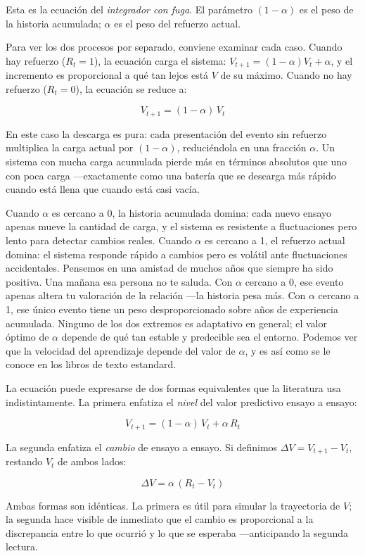 \documentclass[
  letterpaper,
  DIV=11,
  numbers=noendperiod]{scrreprt}
\begin{document}
\begin{tcolorbox}[enhanced jigsaw, toprule=.15mm, arc=.35mm, colback=white, opacityback=0, colframe=quarto-callout-note-color-frame, breakable, rightrule=.15mm, left=2mm, leftrule=.75mm, bottomrule=.15mm]
Esta es la ecuación del \emph{integrador con fuga}. El parámetro
\((1-\alpha)\) es el peso de la historia acumulada; \(\alpha\) es el
peso del refuerzo actual.

Para ver los dos procesos por separado, conviene examinar cada caso.
Cuando hay refuerzo (\(R_t = 1\)), la ecuación carga el sistema:
\(V_{t+1} = (1-\alpha)V_t + \alpha\), y el incremento es proporcional a
qué tan lejos está \(V\) de su máximo. Cuando no hay refuerzo
(\(R_t = 0\)), la ecuación se reduce a:

\[V_{t+1} = (1-\alpha)\,V_t\]

En este caso la descarga es pura: cada presentación del evento sin
refuerzo multiplica la carga actual por \((1-\alpha)\), reduciéndola en
una fracción \(\alpha\). Un sistema con mucha carga acumulada pierde más
en términos absolutos que uno con poca carga ---exactamente como una
batería que se descarga más rápido cuando está llena que cuando está
casi vacía.

Cuando \(\alpha\) es cercano a 0, la historia acumulada domina: cada
nuevo ensayo apenas mueve la cantidad de carga, y el sistema es
resistente a fluctuaciones pero lento para detectar cambios reales.
Cuando \(\alpha\) es cercano a 1, el refuerzo actual domina: el sistema
responde rápido a cambios pero es volátil ante fluctuaciones
accidentales. Pensemos en una amistad de muchos años que siempre ha sido
positiva. Una mañana esa persona no te saluda. Con \(\alpha\) cercano a
0, ese evento apenas altera tu valoración de la relación ---la historia
pesa más. Con \(\alpha\) cercano a 1, ese único evento tiene un peso
desproporcionado sobre años de experiencia acumulada. Ninguno de los dos
extremos es adaptativo en general; el valor óptimo de \(\alpha\) depende
de qué tan estable y predecible sea el entorno. Podemos ver que la
velocidad del aprendizaje depende del valor de \(\alpha\), y es así como
se le conoce en los libros de texto estandard.

La ecuación puede expresarse de dos formas equivalentes que la
literatura usa indistintamente. La primera enfatiza el \emph{nivel} del
valor predictivo ensayo a ensayo:

\[V_{t+1} = (1-\alpha)\,V_t + \alpha\,R_t\]

La segunda enfatiza el \emph{cambio} de ensayo a ensayo. Si definimos
\(\Delta V = V_{t+1} - V_t\), restando \(V_t\) de ambos lados:

\[\Delta V = \alpha\,(R_t - V_t)\]

Ambas formas son idénticas. La primera es útil para simular la
trayectoria de \(V\); la segunda hace visible de inmediato que el cambio
es proporcional a la discrepancia entre lo que ocurrió y lo que se
esperaba ---anticipando la segunda lectura.


\end{tcolorbox}
\end{document}
